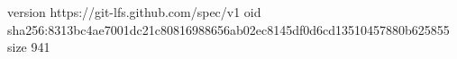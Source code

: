 version https://git-lfs.github.com/spec/v1
oid sha256:8313bc4ae7001dc21c80816988656ab02ec8145df0d6cd13510457880b625855
size 941
